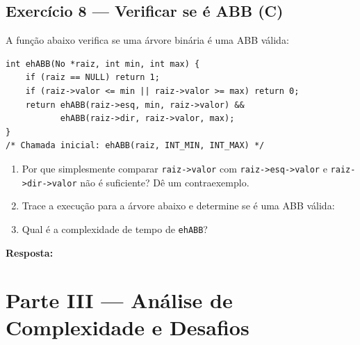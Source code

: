 \documentclass[12pt, a4paper]{article}
\newenvironment{resposta}{%
    \begin{mdframed}[linecolor=black!30, backgroundcolor=white,
                     innertopmargin=10pt, innerbottommargin=30pt,
                     skipabove=6pt]
    \textbf{Resposta:}\\[4pt]
}{%
    \end{mdframed}
}
\begin{document}
\subsection*{Exercício 8 — Verificar se é ABB (C)}

A função abaixo verifica se uma árvore binária é uma ABB válida:

\begin{lstlisting}[style=cstyle]
int ehABB(No *raiz, int min, int max) {
    if (raiz == NULL) return 1;
    if (raiz->valor <= min || raiz->valor >= max) return 0;
    return ehABB(raiz->esq, min, raiz->valor) &&
           ehABB(raiz->dir, raiz->valor, max);
}
/* Chamada inicial: ehABB(raiz, INT_MIN, INT_MAX) */
\end{lstlisting}

\begin{enumerate}[label=(\alph*)]
    \item Por que simplesmente comparar \texttt{raiz->valor} com \texttt{raiz->esq->valor} e \texttt{raiz->dir->valor} não é suficiente? Dê um contraexemplo.
    \item Trace a execução para a árvore abaixo e determine se é uma ABB válida:

\begin{center}
\end{center}

    \item Qual é a complexidade de tempo de \texttt{ehABB}?
\end{enumerate}

\begin{resposta}
\vspace{4.5cm}
\end{resposta}

\section*{Parte III — Análise de Complexidade e Desafios}
\end{document}
